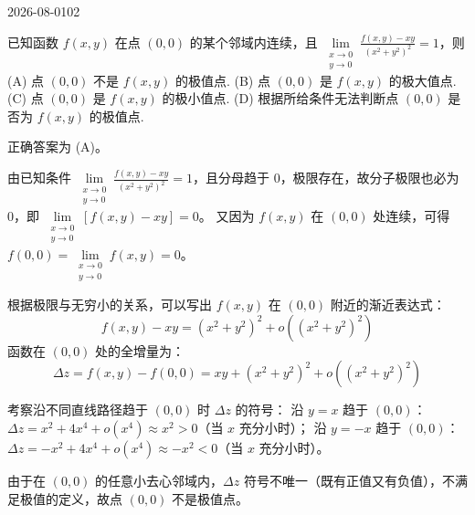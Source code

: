 \begin{mistake}{2026-08-01}{02}

\begin{problemcontent}
已知函数 $f(x,y)$ 在点 $(0,0)$ 的某个邻域内连续，且 $\lim\limits_{\substack{x \to 0 \\ y \to 0}} \frac{f(x,y) - xy}{(x^2 + y^2)^2} = 1$，则
(A) 点 $(0,0)$ 不是 $f(x,y)$ 的极值点.
(B) 点 $(0,0)$ 是 $f(x,y)$ 的极大值点.
(C) 点 $(0,0)$ 是 $f(x,y)$ 的极小值点.
(D) 根据所给条件无法判断点 $(0,0)$ 是否为 $f(x,y)$ 的极值点.
\end{problemcontent}

\begin{solutioncontent}
正确答案为 (A)。

由已知条件 $\lim\limits_{\substack{x \to 0 \\ y \to 0}} \frac{f(x,y) - xy}{(x^2 + y^2)^2} = 1$，且分母趋于 $0$，极限存在，故分子极限也必为 $0$，即 $\lim\limits_{\substack{x \to 0 \\ y \to 0}} [f(x,y) - xy] = 0$。
又因为 $f(x,y)$ 在 $(0,0)$ 处连续，可得 $f(0,0) = \lim\limits_{\substack{x \to 0 \\ y \to 0}} f(x,y) = 0$。

根据极限与无穷小的关系，可以写出 $f(x,y)$ 在 $(0,0)$ 附近的渐近表达式：
\[ f(x,y) - xy = (x^2 + y^2)^2 + o((x^2 + y^2)^2) \]
函数在 $(0,0)$ 处的全增量为：
\[ \Delta z = f(x,y) - f(0,0) = xy + (x^2 + y^2)^2 + o((x^2 + y^2)^2) \]

考察沿不同直线路径趋于 $(0,0)$ 时 $\Delta z$ 的符号：
沿 $y=x$ 趋于 $(0,0)$：$\Delta z = x^2 + 4x^4 + o(x^4) \approx x^2 > 0$（当 $x$ 充分小时）；
沿 $y=-x$ 趋于 $(0,0)$：$\Delta z = -x^2 + 4x^4 + o(x^4) \approx -x^2 < 0$（当 $x$ 充分小时）。

由于在 $(0,0)$ 的任意小去心邻域内，$\Delta z$ 符号不唯一（既有正值又有负值），不满足极值的定义，故点 $(0,0)$ 不是极值点。
\end{solutioncontent}


\end{mistake}
